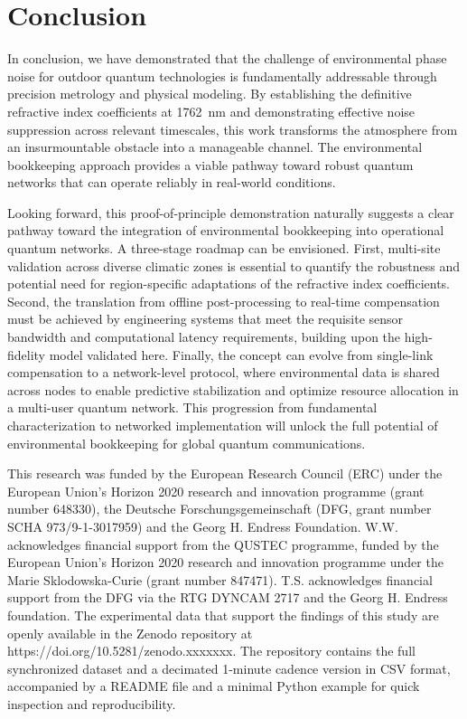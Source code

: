 \documentclass[aps,pra,reprint,groupedaddress,twocolumn,superscriptaddress]{revtex4-2}
\begin{document}
\section{Conclusion}
\label{sec:conclusion}

In conclusion, we have demonstrated that the challenge of environmental phase noise for outdoor quantum technologies is fundamentally addressable through precision metrology and physical modeling. By establishing the definitive refractive index coefficients at \SI{1762}{\nano\meter} and demonstrating effective noise suppression across relevant timescales, this work transforms the atmosphere from an insurmountable obstacle into a manageable channel. The environmental bookkeeping approach provides a viable pathway toward robust quantum networks that can operate reliably in real-world conditions.

Looking forward, this proof-of-principle demonstration naturally suggests a clear pathway toward the integration of environmental bookkeeping into operational quantum networks. A three-stage roadmap can be envisioned. First, multi-site validation across diverse climatic zones is essential to quantify the robustness and potential need for region-specific adaptations of the refractive index coefficients. Second, the translation from offline post-processing to real-time compensation must be achieved by engineering systems that meet the requisite sensor bandwidth and computational latency requirements, building upon the high-fidelity model validated here. Finally, the concept can evolve from single-link compensation to a network-level protocol, where environmental data is shared across nodes to enable predictive stabilization and optimize resource allocation in a multi-user quantum network. This progression from fundamental characterization to networked implementation will unlock the full potential of environmental bookkeeping for global quantum communications.

\begin{acknowledgments}
This research was funded by the European Research Council (ERC) under the European Union’s Horizon 2020 research and innovation programme (grant number 648330), the Deutsche Forschungsgemeinschaft (DFG, grant number SCHA 973/9-1-3017959) and the Georg H. Endress Foundation. W.W. acknowledges financial support from the QUSTEC programme, funded by the European Union’s Horizon 2020 research and innovation programme under the Marie Sklodowska-Curie (grant number 847471). T.S. acknowledges financial support from the DFG via the RTG DYNCAM 2717 and the Georg H. Endress foundation. The experimental data that support the findings of this study are openly available in the Zenodo repository at https://doi.org/10.5281/zenodo.xxxxxxx. The repository contains the full synchronized dataset and a decimated 1-minute cadence version in CSV format, accompanied by a README file and a minimal Python example for quick inspection and reproducibility.
\end{acknowledgments}
\end{document}
